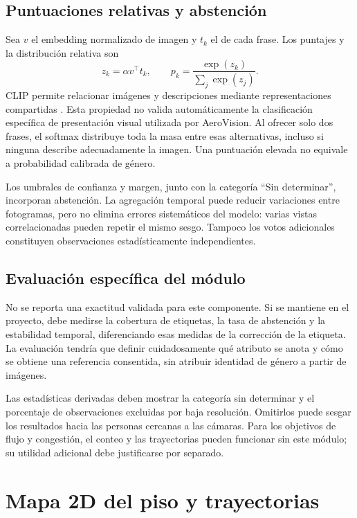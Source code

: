 \documentclass[12pt,letterpaper]{article}
\begin{document}
\subsection{Puntuaciones relativas y abstención}
Sea $v$ el embedding normalizado de imagen y $t_k$ el de cada frase. Los puntajes y la distribución relativa son
\begin{equation}
 z_k=\alpha v^\top t_k,\qquad p_k=\frac{\exp(z_k)}{\sum_j\exp(z_j)}.
\end{equation}
CLIP permite relacionar imágenes y descripciones mediante representaciones compartidas \cite{clip}. Esta propiedad no valida automáticamente la clasificación específica de presentación visual utilizada por AeroVision. Al ofrecer solo dos frases, el softmax distribuye toda la masa entre esas alternativas, incluso si ninguna describe adecuadamente la imagen. Una puntuación elevada no equivale a probabilidad calibrada de género.

Los umbrales de confianza y margen, junto con la categoría ``Sin determinar'', incorporan abstención. La agregación temporal puede reducir variaciones entre fotogramas, pero no elimina errores sistemáticos del modelo: varias vistas correlacionadas pueden repetir el mismo sesgo. Tampoco los votos adicionales constituyen observaciones estadísticamente independientes.

\subsection{Evaluación específica del módulo}
No se reporta una exactitud validada para este componente. Si se mantiene en el proyecto, debe medirse la cobertura de etiquetas, la tasa de abstención y la estabilidad temporal, diferenciando esas medidas de la corrección de la etiqueta. La evaluación tendría que definir cuidadosamente qué atributo se anota y cómo se obtiene una referencia consentida, sin atribuir identidad de género a partir de imágenes.

Las estadísticas derivadas deben mostrar la categoría sin determinar y el porcentaje de observaciones excluidas por baja resolución. Omitirlos puede sesgar los resultados hacia las personas cercanas a las cámaras. Para los objetivos de flujo y congestión, el conteo y las trayectorias pueden funcionar sin este módulo; su utilidad adicional debe justificarse por separado.

\section{Mapa 2D del piso y trayectorias}
\end{document}
